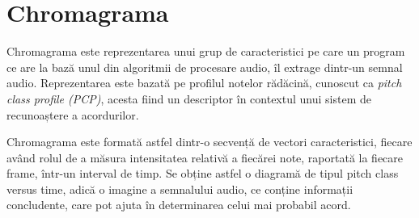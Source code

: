 \documentclass[a4paper,12pt]{report}
\begin{document}

\newpage
\section{Chromagrama}
Chromagrama este reprezentarea unui grup de caracteristici pe care un program ce are la 
bază unul din algoritmii de procesare audio, îl extrage dintr-un semnal audio. Reprezentarea 
este bazată pe profilul notelor rădăcină, cunoscut ca \emph{pitch class profile (PCP)}, acesta 
fiind un descriptor în contextul unui sistem de recunoaștere a acordurilor. 

Chromagrama este formată astfel dintr-o secvență de vectori caracteristici, fiecare având 
rolul de a măsura intensitatea relativă a fiecărei note, raportată la fiecare frame, într-un interval 
de timp. Se obține astfel o diagramă de tipul pitch class versus time, adică o imagine 
a semnalului audio, ce conține informații concludente, care pot ajuta în determinarea celui 
mai probabil acord.

\end{document}
